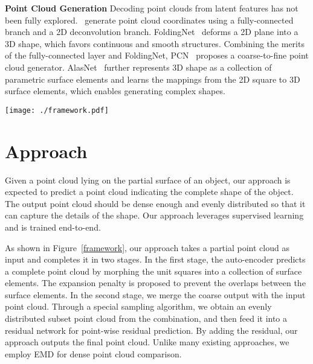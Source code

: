 \documentclass[letterpaper]{article} \usepackage{aaai20}  \usepackage{times}  \usepackage{helvet} \usepackage{courier}  \usepackage[hyphens]{url}  \usepackage{graphicx} \urlstyle{rm} \def\UrlFont{\rm}  \usepackage{graphicx}  \frenchspacing  \setlength{\pdfpagewidth}{8.5in}  \setlength{\pdfpageheight}{11in}  \usepackage{amsmath}
\begin{document}
\textbf{Point Cloud Generation} Decoding point clouds from latent features has not been fully explored.~\citeauthor{fan2017point} generate point cloud coordinates using a fully-connected branch and a 2D deconvolution branch. FoldingNet~\cite{yang2018foldingnet} deforms a 2D plane into a 3D shape, which favors continuous and smooth structures. Combining the merits of the fully-connected layer and FoldingNet, PCN~\cite{yuan2018pcn} proposes a coarse-to-fine point cloud generator. AlasNet~\cite{groueix2018papier} further represents 3D shape as a collection of parametric surface elements and learns the mappings from the 2D square to 3D surface elements, which enables generating complex shapes. 



\begin{figure*}[t]
  \centering
  \texttt{[image: ./framework.pdf]}
  \caption{Architecture of our approach. ``GFV'' denotes the generalized feature vector,  and  denotes the expansion penalty and Earth Mover's Distance respectively. `` Sampling'' denotes sampling 2D points on a unit square. The morphing-based decoder morphs the unit squares into a collection of surface elements, which are assembled into the coarse output. The minimum density sampling outputs an evenly distributed subset point cloud.}
  \label{framework}
\end{figure*}

\section{Approach}

Given a point cloud lying on the partial surface of an object, our approach is expected to predict a point cloud indicating the complete shape of the object. The output point cloud should be dense enough and evenly distributed so that it can capture the details of the shape. Our approach leverages supervised learning and is trained end-to-end. 

As shown in Figure~\ref{framework}, our approach takes a partial point cloud as input and completes it in two stages. In the first stage, the auto-encoder predicts a complete point cloud by morphing the unit squares into a collection of surface elements. The expansion penalty is proposed to prevent the overlaps between the surface elements. In the second stage, we merge the coarse output with the input point cloud. Through a special sampling algorithm, we obtain an evenly distributed subset point cloud from the combination, and then feed it into a residual network for point-wise residual prediction. By adding the residual, our approach outputs the final point cloud. Unlike many existing approaches, we employ EMD for dense point cloud comparison.
\end{document}
